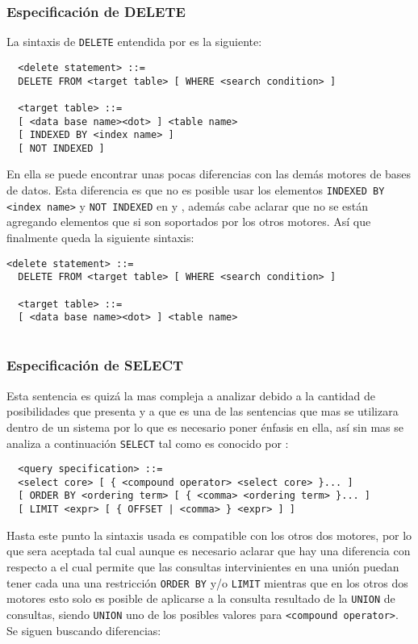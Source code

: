 \subsubsection{Especificación de DELETE} 
\label{especificacion:dialectos:delete}
La sintaxis de \verb=DELETE= entendida por \s es la siguiente:
%
\begin{Verbatim}
  <delete statement> ::=
  DELETE FROM <target table> [ WHERE <search condition> ]

  <target table> ::=
  [ <data base name><dot> ] <table name>
  [ INDEXED BY <index name> ]
  [ NOT INDEXED ]
\end{Verbatim}
%
En ella se puede encontrar unas pocas diferencias con las demás motores de bases de datos. Esta diferencia es que no es posible usar los elementos \verb=INDEXED BY <index name>= y \verb=NOT INDEXED= en \p y \m, además cabe aclarar que no se están agregando elementos que si son soportados por los otros motores. Así que finalmente queda la siguiente sintaxis:
%
%
\begin{Verbatim}[frame=single, label=sintaxis para DELETE]
  <delete statement> ::=
  DELETE FROM <target table> [ WHERE <search condition> ]
  
  <target table> ::=
  [ <data base name><dot> ] <table name>
  
\end{Verbatim}
%
%
%
%
\subsubsection{Especificación de SELECT} 
\label{especificacion:dialectos:select}
Esta sentencia es quizá la mas compleja a analizar debido a la cantidad de posibilidades que presenta y a que es una de las sentencias que mas se utilizara dentro de un sistema por lo que es necesario poner énfasis en ella, así sin mas se analiza a continuación \verb=SELECT= tal como es conocido por \s:
%
\begin{Verbatim}
  <query specification> ::=
  <select core> [ { <compound operator> <select core> }... ]
  [ ORDER BY <ordering term> [ { <comma> <ordering term> }... ]
  [ LIMIT <expr> [ { OFFSET | <comma> } <expr> ] ]  
\end{Verbatim}
%
Hasta este punto la sintaxis usada es compatible con los otros dos motores, por lo que sera aceptada tal cual aunque es necesario aclarar que hay una diferencia con respecto a \m el cual permite que las consultas intervinientes en una unión puedan tener cada una una restricción \verb=ORDER BY= y/o \verb=LIMIT= mientras que en los otros dos motores esto solo es posible de aplicarse a la consulta resultado de la \verb=UNION= de consultas, siendo \verb=UNION= uno de los posibles valores para \verb=<compound operator>=. Se siguen buscando diferencias:

